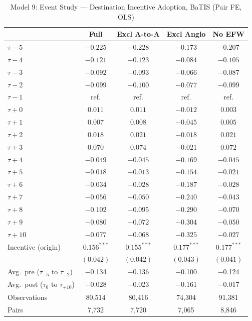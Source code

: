 \begin{table}[htbp]
\centering
\caption{Model 9: Event Study --- Destination Incentive Adoption, BaTIS (Pair FE, OLS)}
\label{tab:batis_model9}
\footnotesize
\begin{tabular}{l cccc}
\toprule
 & Full & Excl A-to-A & Excl Anglo & No EFW \\
\midrule
$\tau-5$ & $-0.225$ & $-0.228$ & $-0.173$ & $-0.207$ \\
$\tau-4$ & $-0.121$ & $-0.123$ & $-0.084$ & $-0.105$ \\
$\tau-3$ & $-0.092$ & $-0.093$ & $-0.066$ & $-0.087$ \\
$\tau-2$ & $-0.099$ & $-0.100$ & $-0.077$ & $-0.099$ \\
$\tau-1$ & ref. & ref. & ref. & ref. \\
$\tau+0$ & $0.011$ & $0.011$ & $-0.012$ & $0.003$ \\
$\tau+1$ & $0.007$ & $0.008$ & $-0.045$ & $0.005$ \\
$\tau+2$ & $0.018$ & $0.021$ & $-0.018$ & $0.021$ \\
$\tau+3$ & $0.070$ & $0.074$ & $-0.021$ & $0.072$ \\
$\tau+4$ & $-0.049$ & $-0.045$ & $-0.169$ & $-0.045$ \\
$\tau+5$ & $-0.018$ & $-0.013$ & $-0.154$ & $-0.021$ \\
$\tau+6$ & $-0.034$ & $-0.028$ & $-0.187$ & $-0.028$ \\
$\tau+7$ & $-0.056$ & $-0.050$ & $-0.240$ & $-0.043$ \\
$\tau+8$ & $-0.102$ & $-0.095$ & $-0.290$ & $-0.070$ \\
$\tau+9$ & $-0.080$ & $-0.072$ & $-0.304$ & $-0.050$ \\
$\tau+10$ & $-0.077$ & $-0.068$ & $-0.325$ & $-0.027$ \\
\midrule
Incentive (origin) & $0.156^{***}$ & $0.155^{***}$ & $0.177^{***}$ & $0.177^{***}$ \\
 & $(0.042)$ & $(0.042)$ & $(0.043)$ & $(0.041)$ \\
\midrule
Avg.\ pre ($\tau_{-5}$ to $\tau_{-2}$) & $-$0.134 & $-$0.136 & $-$0.100 & $-$0.124 \\
Avg.\ post ($\tau_{0}$ to $\tau_{+10}$) & $-$0.028 & $-$0.023 & $-$0.161 & $-$0.017 \\
Observations & 80,514 & 80,416 & 74,304 & 91,381 \\
Pairs & 7,732 & 7,720 & 7,065 & 8,846 \\
\bottomrule
\end{tabular}

\end{table}
